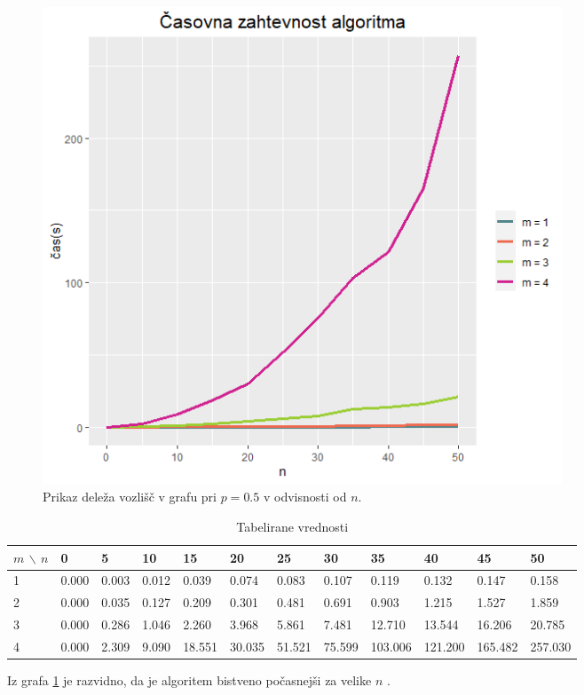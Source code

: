 \documentclass[a4paper, 11pt]{article}
\theoremstyle{definition}
\theoremstyle{definition}
\begin{document}
\begin{figure}[h]
    \centering
    \includegraphics[width=0.75\textwidth]{cas.png}
    \caption{Prikaz deleža vozlišč v grafu pri $p=0.5$ v
    odvisnosti od $n$.}
    \label{fig:cas}
\end{figure}

\begin{table}[!ht]
    \caption{Tabelirane vrednosti}
    \label{tab:cas}
    \begin{adjustwidth}{-2cm}{}
    \begin{tabular}{|l|l|l|l|l|l|l|l|l|l|l|l|}
    \hline
        $m$ $\backslash$ $n$ & 0 & 5 & 10 & 15 & 20 & 25 & 30 & 35 & 40 & 45 & 50 \\ \hline
        1 & 0.000 & 0.003 & 0.012 & 0.039 & 0.074 & 0.083 & 0.107 & 0.119 & 0.132 & 0.147 & 0.158 \\ \hline
        2 & 0.000 & 0.035 & 0.127 & 0.209 & 0.301 & 0.481 & 0.691 & 0.903 & 1.215 & 1.527 & 1.859 \\ \hline
        3 & 0.000 & 0.286 & 1.046 & 2.260 & 3.968 & 5.861 & 7.481 & 12.710 & 13.544 & 16.206 & 20.785 \\ \hline
        4 & 0.000 & 2.309 & 9.090 & 18.551 & 30.035 & 51.521 & 75.599 & 103.006 & 121.200 & 165.482 & 257.030 \\ \hline
    \end{tabular}
    \end{adjustwidth}
\end{table}

Iz grafa \ref{fig:cas} je razvidno, da je algoritem bistveno počasnejši za 
velike $n$ .
\end{document}
